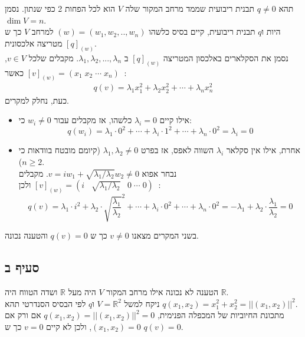 \documentclass{article}
\def\reals{\mathbb{R}}
\DeclareMathOperator{\tra}{^t}
\begin{document}
תהא $q\ne 0$ תבנית ריבועית שממד מרחב המקור שלה $V$ הוא לכל הפחות 2 כפי שנתון. נסמן $\dim V=n$. \\
היות ו$q$ תבנית ריבועית, קיים בסיס כלשהו $(w)=(w_1, w_2, .., w_n)$ למרחב $V$ כך ש$[q]_{(w)}$ מטריצה אלכסונית. \\
נסמן את הסקלארים באלכסון המטריצה $[q]_{(w)}$ ב $\lambda_1, \lambda_2, ..., \lambda_n$. מקבלים שלכל $v\in V$, כאשר $[v]_{(w)}=(x_1 \; x_2 \; \cdots \; x_n)\tra$:
\begin{align*}
    q(v)=\lambda_1x_1^2 + \lambda_2x_2^2+\cdots+\lambda_nx_n^2
\end{align*}
כעת, נחלק למקרים.
\begin{itemize}
    \item אילו קיים $\lambda_i=0$ כלשהו, אז מקבלים עבור $w_i\ne 0$ כי: \[
              q(w_i)=\lambda_1 \cdot 0^2 + \cdots + \lambda_i \cdot 1^2 + \cdots + \lambda_n \cdot 0^2 = \lambda_i=0
          \]
    \item אחרת, אילו אין סקלאר $\lambda_i$ השווה לאפס, אז בפרט $\lambda_1, \lambda_2\ne 0$ (קיומם מובטח בוודאות כי $n\geq 2$). \\
          נבחר אפוא $v=iw_1+\sqrt{\lambda_1/\lambda_2}w_2\ne 0$. מקבלים $[v]_{(w)}=(i \;\;\; \sqrt{\lambda_1/\lambda_2} \;\;\; 0 \; \cdots \; 0) \tra$ ולכן: \[
              q(v)=\lambda_1 \cdot i^2 + \lambda_2 \cdot \sqrt{\frac{\lambda_1}{\lambda_2}}^2 + \cdots + \lambda_i \cdot 0^2 + \cdots + \lambda_n \cdot 0^2 = -\lambda_1 + \lambda_2 \cdot \frac{\lambda_1}{\lambda_2}=0
          \]
\end{itemize}
בשני המקרים מצאנו $v\ne 0$ כך ש $q(v)=0$ והטענה נכונה.

\subsection*{סעיף ב}

הטענה לא נכונה אילו מרחב המקור $V$ היה מעל $\reals$ ושדה הטווח היה $\reals$. \\
ניקח למשל $V=\reals^2$ ו$q$ לפי הבסיס הסנדרטי תהא $q(x_1, x_2)=x_1^2+x_2^2=||(x_1, x_2)||^2$.\\
מתכונת החיוביות של המכפלה הפנימית, $q(x_1, x_2)=||(x_1, x_2)||^2=0$ אם ורק אם $(x_1, x_2)=0$, ולכן לא קיים $v=0$ כך ש $q(v)=0$.
\end{document}
